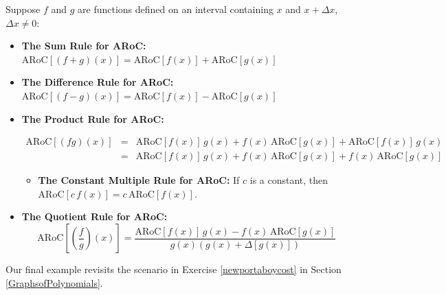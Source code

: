 \documentclass{ximera}
\begin{document}

\begin{theorem}  \label{functionarithmeticaroc}  Suppose $f$ and $g$ are functions defined on an interval containing $x$ and $x + \Delta x$, $\Delta x \neq 0$:
\begin{itemize}

\item  \textbf{The Sum Rule for ARoC:}   $\text{ARoC}[(f + g)(x)] = \text{ARoC}[f(x)] + \text{ARoC}[g(x)]$

\item  \textbf{The Difference Rule for ARoC:}   $\text{ARoC}[(f - g)(x)] = \text{ARoC}[f(x)] - \text{ARoC}[g(x)]$

\item  \textbf{The Product Rule for ARoC:}  

\[ \begin{array}{rcl}

\text{ARoC}[(fg)(x)]  & = & \text{ARoC}[f(x)] \, g(x) + f(x) \, \text{ARoC}[g(x)]  + \text{ARoC}[f(x)] \, g(x) \\
                       & = &   \text{ARoC}[f(x)] \, g(x) + f(x) \, \text{ARoC}[g(x)]  + f(x) \, \text{ARoC}[g(x)]   \end{array} \]
                       
                       \begin{itemize}

\item  \textbf{The Constant Multiple Rule for ARoC:}  If $c$ is a constant, then  $\text{ARoC}[c \, f(x)] = c \,  \text{ARoC}[f(x)]$.

\end{itemize}

\item  \textbf{The Quotient Rule for ARoC:}  \[\text{ARoC}\left[\left( \frac{f}{g} \right) (x) \right] = \frac{ \text{ARoC}[f(x)] \,  g(x)  - f(x) \, \text{ARoC}[g(x)]}{g(x) (g(x) + \Delta[g(x)])}\]


\end{itemize}

\end{theorem}



Our final example  revisits the scenario in Exercise \ref{newportaboycost} in Section \ref{GraphsofPolynomials}.  
\end{document}
